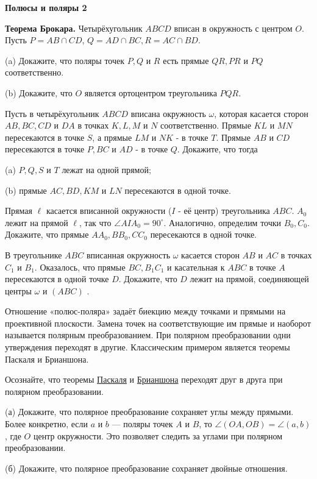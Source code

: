 \centerline{\bf \Huge Полюсы и поляры 2}


\textbf{Теорема Брокара.}
Четырёхугольник $A B C D$ вписан в окружность с центром $O$. Пусть $P=A B \cap C D$, $Q=A D \cap B C, R=A C \cap B D$.

(a) Докажите, что поляры точек $P, Q$ и $R$ есть прямые $Q R, P R$ и $P Q$ соответственно.

(b) Докажите, что $O$ является ортоцентром треугольника $P Q R$.

Пусть в четырёхугольник $A B C D$ вписана окружность $\omega$, которая касается сторон $A B, B C, C D$ и $D A$ в точках $K, L, M$ и $N$ соответственно. Прямые $K L$ и $M N$ пересекаются в точке $S$, а прямые $L M$ и $N K$ - в точке $T$. Прямые $A B$ и $C D$ пересекаются в точке $P, B C$ и $A D$ - в точке $Q$. Докажите, что тогда

(a) $P, Q, S$ и $T$ лежат на одной прямой;

(b) прямые $A C, B D, K M$ и $L N$ пересекаются в одной точке.

Прямая $\ell$ касается вписанной окружности ($I$ - её центр) треугольника $A B C$. $A_0$ лежит на прямой $\ell$, так что $\angle A I A_0=90^{\circ}$. Аналогично, определим точки $B_0, C_0$. Докажите, что прямые $A A_0, B B_0, C C_0$ пересекаются в одной точке.

В треугольнике $A B C$ вписанная окружность $\omega$ касается сторон $A B$ и $A C$ в точках $C_1$ и $B_1$. Оказалось, что прямые $B C, B_1 C_1$ и касательная к $A B C$ в точке $A$ пересекаются в одной точке $D$. Докажите, что $D$ лежит на прямой, соединяющей центры $\omega$ и $(A B C)$ .

Отношение «полюс-поляра» задаёт биекцию между точками и прямыми на проективной плоскости. Замена точек на соответствующие им прямые и наоборот называется полярным преобразованием. При полярном преобразовании одни утверждения переходят в другие. Классическим примером является теоремы Паскаля и Брианшона.

Осознайте, что теоремы
\href{https://ru.wikipedia.org/wiki/%D0%A2%D0%B5%D0%BE%D1%80%D0%B5%D0%BC%D0%B0_%D0%9F%D0%B0%D1%81%D0%BA%D0%B0%D0%BB%D1%8F}{Паскаля}
и
\href{https://ru.wikipedia.org/wiki/%D0%A2%D0%B5%D0%BE%D1%80%D0%B5%D0%BC%D0%B0_%D0%91%D1%80%D0%B8%D0%B0%D0%BD%D1%88%D0%BE%D0%BD%D0%B0}{Брианшона}
переходят друг в друга при полярном преобразовании.


(а)
Докажите, что полярное преобразование сохраняет углы между прямыми. Более конкретно, если $a$ и $b$ --- поляры точек $A$ и $B$, то $\angle(O A, O B)= \angle(a, b)$, где $O$ центр окружности. Это позволяет следить за углами при полярном преобразовании.

\noindent
(б) 
Докажите, что полярное преобразование сохраняет двойные отношения.